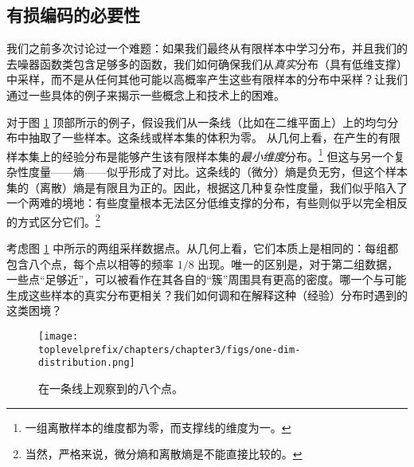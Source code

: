 \documentclass[../../book-main.tex]{subfiles}
\begin{document}
\subsection{有损编码的必要性}



我们之前多次讨论过一个难题：如果我们最终从有限样本中学习分布，并且我们的去噪器函数类包含足够多的函数，我们如何确保我们从\textit{真实}分布（具有低维支撑）中采样，而不是从任何其他可能以高概率产生这些有限样本的分布中采样？让我们通过一些具体的例子来揭示一些概念上和技术上的困难。

\begin{example}[体积、维度和熵]\label{eg:measures-of-complexity}
对于图 \ref{fig:1d-line} 顶部所示的例子，假设我们从一条线（比如在二维平面上）上的均匀分布中抽取了一些样本。这条线或样本集的体积为零。
从几何上看，在产生的有限样本集上的经验分布是能够产生该有限样本集的{\em 最小维度}分布。\footnote{一组离散样本的维度都为零，而支撑线的维度为一。} 但这与另一个复杂性度量——熵——似乎形成了对比。这条线的（微分）熵是负无穷，但这个样本集的（离散）熵是有限且为正的。因此，根据这几种复杂性度量，我们似乎陷入了一个两难的境地：有些度量根本无法区分低维支撑的分布，有些则似乎以完全相反的方式区分它们。\footnote{当然，严格来说，微分熵和离散熵是不能直接比较的。}
\end{example}

\begin{example}[密度]\label{eg:density} 考虑图 \ref{fig:1d-line} 中所示的两组采样数据点。从几何上看，它们本质上是相同的：每组都包含八个点，每个点以相等的频率 $1/8$ 出现。唯一的区别是，对于第二组数据，一些点“足够近”，可以被看作在其各自的“簇”周围具有更高的密度。哪一个与可能生成这些样本的真实分布更相关？我们如何调和在解释这种（经验）分布时遇到的这类困境？
\begin{figure}[t]
	\centering
	\texttt{[image: \\toplevelprefix/chapters/chapter3/figs/one-dim-distribution.png]}
	\caption{在一条线上观察到的八个点。}
	\label{fig:1d-line}
\end{figure}
\end{example}
\end{document}

